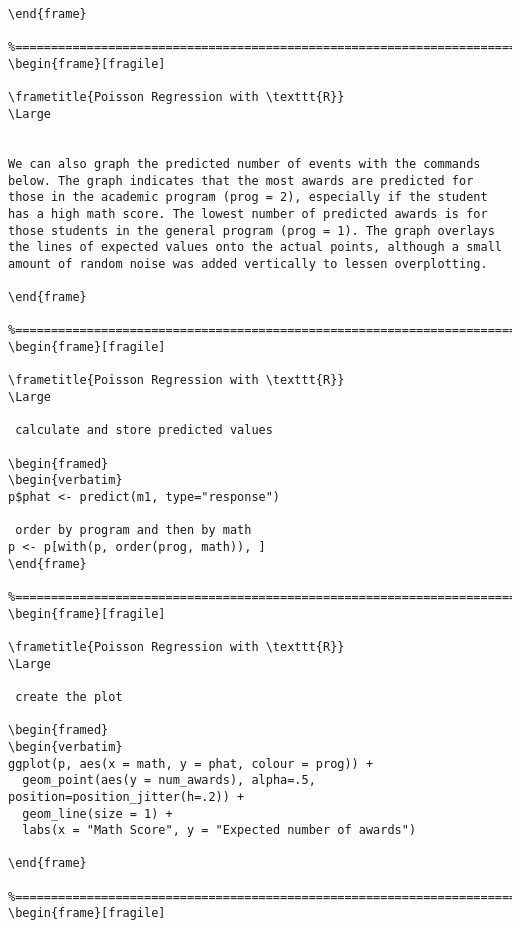 \begin{frame}[fragile]
\begin{framed}
\begin{verbatim}
\end{frame}

%================================================================================================%
\begin{frame}[fragile]

\frametitle{Poisson Regression with \texttt{R}}
\Large


We can also graph the predicted number of events with the commands below. The graph indicates that the most awards are predicted for those in the academic program (prog = 2), especially if the student has a high math score. The lowest number of predicted awards is for those students in the general program (prog = 1). The graph overlays the lines of expected values onto the actual points, although a small amount of random noise was added vertically to lessen overplotting.

\end{frame}

%================================================================================================%
\begin{frame}[fragile]

\frametitle{Poisson Regression with \texttt{R}}
\Large

 calculate and store predicted values

\begin{framed}
\begin{verbatim}
p$phat <- predict(m1, type="response")

 order by program and then by math
p <- p[with(p, order(prog, math)), ]
\end{frame}

%================================================================================================%
\begin{frame}[fragile]

\frametitle{Poisson Regression with \texttt{R}}
\Large

 create the plot

\begin{framed}
\begin{verbatim}
ggplot(p, aes(x = math, y = phat, colour = prog)) +
  geom_point(aes(y = num_awards), alpha=.5, position=position_jitter(h=.2)) +
  geom_line(size = 1) +
  labs(x = "Math Score", y = "Expected number of awards")
 
\end{frame}

%================================================================================================%
\begin{frame}[fragile]


\end{verbatim}
\end{framed}
\end{frame}
